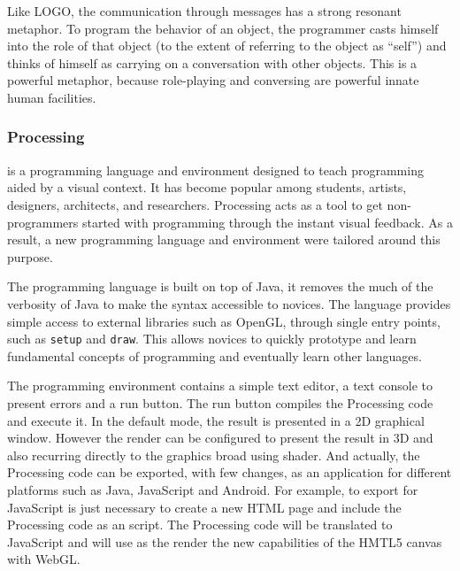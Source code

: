 Like LOGO, the communication through messages has a strong resonant metaphor. To program the behavior of an object, the programmer casts himself into the role of that object (to the extent of referring to the object as ``self'') and thinks of himself as carrying on a conversation with other objects. This is a powerful metaphor, because role-playing and conversing are powerful innate human facilities. 
\subsubsection{Processing~\cite{Reas2006}} is a programming language and environment designed to teach programming aided by a visual context. It has become popular among students, artists, designers, architects, and researchers. Processing acts as a tool to get non-programmers started with programming through the instant visual feedback. As a result, a new programming language and environment were tailored around this purpose.

The programming language is built on top of Java, it removes the much of the verbosity of Java to make the syntax accessible to novices. The language provides simple access to external libraries such as OpenGL, through single entry points, such as \texttt{setup} and \texttt{draw}. This allows novices to quickly prototype and learn fundamental concepts of programming and eventually learn other languages.

The programming environment contains a simple text editor, a text console to present errors and a run button. The run button compiles the Processing code and execute it. In the default mode, the result is presented in a 2D graphical window. However the render can be configured to present the result in 3D and also recurring directly to the graphics broad using shader. And actually, the Processing code can be exported, with few changes, as an application for different platforms such as Java, JavaScript and Android. For example, to export for JavaScript is just necessary to create a new HTML page and include the Processing code as an script. The Processing code will be translated to JavaScript and will use as the render the new capabilities of the HMTL5 canvas with WebGL.

